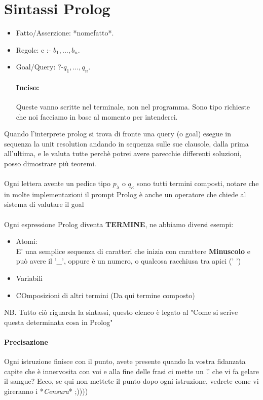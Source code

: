 \documentclass[12pt, a4paper, openany, oneside]{book}
\begin{document}
\section{Sintassi Prolog}
\begin{itemize}
	\item Fatto/Asserzione: *nomefatto*. 
	\item Regole: c :- $b_{1}, ..., b_{n}$.
	\item Goal/Query: ?-$q_{1}, ..., q_{n}$.
	\paragraph{Inciso: }Queste vanno scritte nel terminale, non nel programma.
	Sono tipo richieste che noi facciamo in base al momento per intenderci. 
\end{itemize}
Quando l'interprete prolog si trova di fronte una query (o goal) esegue in 
sequenza la unit resolution andando in sequenza sulle sue clausole, dalla prima
all'ultima, e le valuta tutte perchè potrei avere parecchie differenti soluzioni, 
posso dimostrare più teoremi.
\\ \\
Ogni lettera avente un pedice tipo $p_{\lambda}$ o $q_{\kappa}$ sono tutti 
termini composti, notare che in molte implementazioni il prompt Prolog è anche 
un operatore che chiede al sistema di valutare il \color{blue} goal \color{black}
\\ \\
Ogni espressione Prolog diventa \textbf{TERMINE}, ne abbiamo diversi esempi:
\begin{itemize}
	\item Atomi: \\
	E' una semplice sequenza di caratteri che inizia con carattere \textbf{Minuscolo}
	e può avere il '\_', oppure è un numero, o qualcosa racchiusa tra apici (' ') 
	\item Variabili
	\item COmposizioni di altri termini (Da qui termine composto)
\end{itemize}
NB. Tutto ciò riguarda la sintassi, questo elenco è legato al "Come si scrive 
questa determinata cosa in Prolog" 
\paragraph{Precisazione}
Ogni istruzione finisce con il punto, avete presente quando la vostra fidanzata
capite che è innervosita con voi e alla fine delle frasi ci mette un '.' che vi
fa gelare il sangue? Ecco, se qui non mettete il punto dopo ogni istruzione, 
vedrete come vi gireranno i *\textit{Censura}* ;))))\\ 
\end{document}
